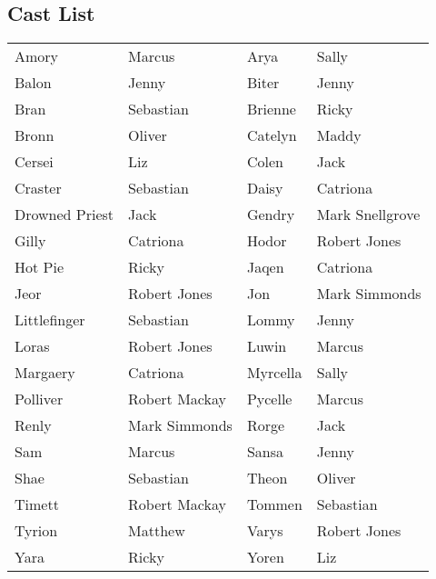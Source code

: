 \subsection*{Cast List}
\begin{tabular}{ll|ll}\\
Amory & Marcus &  Arya & Sally\\
Balon & Jenny &  Biter & Jenny\\
Bran & Sebastian &  Brienne & Ricky\\
Bronn & Oliver &  Catelyn & Maddy\\
Cersei & Liz &  Colen & Jack\\
Craster & Sebastian &  Daisy & Catriona\\
Drowned Priest & Jack &  Gendry & Mark Snellgrove\\
Gilly & Catriona &  Hodor & Robert Jones\\
Hot Pie & Ricky &  Jaqen & Catriona\\
Jeor & Robert Jones &  Jon & Mark Simmonds\\
Littlefinger & Sebastian &  Lommy & Jenny\\
Loras & Robert Jones &  Luwin & Marcus\\
Margaery & Catriona &  Myrcella & Sally\\
Polliver & Robert Mackay &  Pycelle & Marcus\\
Renly & Mark Simmonds &  Rorge & Jack\\
Sam & Marcus &  Sansa & Jenny\\
Shae & Sebastian &  Theon & Oliver\\
Timett & Robert Mackay &  Tommen & Sebastian\\
Tyrion & Matthew &  Varys & Robert Jones\\
Yara & Ricky &  Yoren & Liz\\
\end{tabular}
